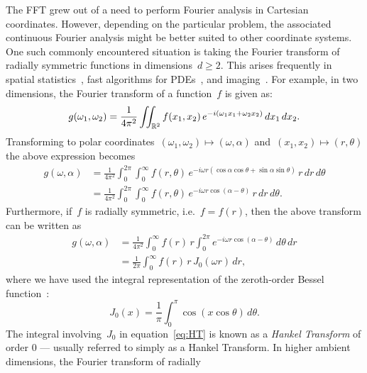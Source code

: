 The FFT grew out of a need to perform Fourier analysis in Cartesian coordinates.
However, depending on the particular problem, the associated continuous Fourier
analysis might be better suited to other coordinate systems. One such commonly
encountered situation is taking the Fourier transform of radially symmetric
functions in dimensions~$ d \geq 2$. This arises frequently in spatial
statistics~\cite{}, fast algorithms for PDEs~\cite{}, and imaging~\cite{}. For
example, in two dimensions, the Fourier transform of a function~$f$ is given as:
\begin{equation}
  g(\omega_1, \omega_2) = \frac{1}{4\pi^2} \iint_{\mathbb{R}^2} f(x_1, x_2) \, 
  e^{-i(\omega_1 x_1 + \omega_2 x_2)}  \, dx_1 \, dx_2.
\end{equation}
Transforming to polar coordinates~$(\omega_1,\omega_2) \mapsto (\omega,\alpha)$
and~$(x_1,x_2) \mapsto (r,\theta)$ the above expression becomes
\begin{equation}
  \label{eq:ftpolar}
  \begin{aligned}
    g(\omega, \alpha) &= \frac{1}{4\pi^2} \int_0^{2\pi} \int_0^\infty
    f(r,\theta) \, 
    e^{-i \omega r (\cos\alpha \cos\theta + \sin\alpha \sin\theta) } 
    \, r \, dr \, d\theta \\
  &= \frac{1}{4\pi^2} \int_0^{2\pi} \int_0^\infty f(r,\theta) \, e^{-i \omega r \cos(\alpha-\theta) } \, r \, dr \, d\theta.
  \end{aligned}
\end{equation}
Furthermore, if~$f$ is radially symmetric, i.e.~$f = f(r)$, then the above
transform can be written as
\begin{equation}
  \label{eq:HT}
  \begin{aligned}
  g(\omega,\alpha) &= \frac{1}{4\pi^2} \int_0^\infty f(r) \, r \int_0^{2\pi} 
  e^{-i \omega r \cos(\alpha - \theta) }  \, d\theta \, dr \\
  &= \frac{1}{2\pi} \int_0^\infty f(r) \, r \, J_0(\omega r)  \, dr,
  \end{aligned}
\end{equation}
where we have used the integral representation of the zeroth-order Bessel
function~\cite{olver2010nist}:
\begin{equation}
  J_0(x) 
  = \frac{1}{\pi} \int_0^\pi \cos \left( x \cos \theta \right) \, d\theta.
\end{equation}
The integral involving~$J_0$ in equation~\eqref{eq:HT} is known as a
\emph{Hankel Transform} of order 0 --- usually referred to simply as a Hankel
Transform. In higher ambient dimensions, the Fourier transform of radially
